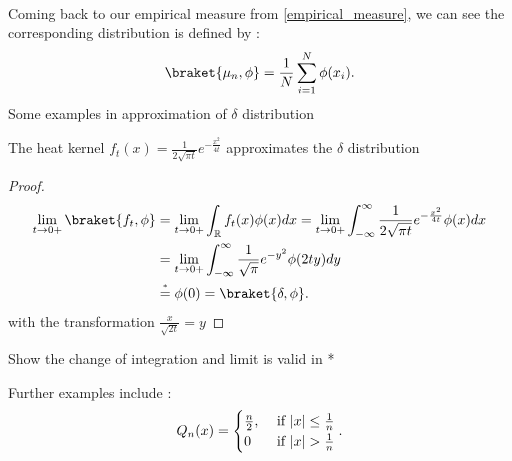 \hspace{0mm}\\
Coming back to our empirical measure from \ref{empirical_measure}, we can see the corresponding distribution is defined by : 
\begin{align*}
  \braket{\mu_n,\phi } = \frac{1}{N} \sum_{i=1}^{N} \phi(x_i)
.\end{align*}
Some examples in approximation of $\delta $ distribution 
\begin{example}
  The heat kernel $f_t(x) = \frac{1}{2 \sqrt{\pi  t} } e^{- \frac{x^2}{4t}} $
  approximates the $\delta $ distribution
\begin{figure}[h]
  \begin{center}
  \end{center}
\end{figure}
\end{example}
\begin{proof}
 \begin{align*}
   \lim_{t \to 0+} \braket{f_t,\phi } &= \lim_{t \to 0+} \int_\mathbb{R} f_t(x) \phi(x) dx = \lim_{t \to 0+} \int_{-\infty}^{\infty} \frac{1}{2 \sqrt{\pi  t} } e^{- \frac{x^2}{4t}}  \phi(x) dx \\
                                      &= \lim_{t \to 0+} \int_{-\infty}^{\infty} \frac{1}{\sqrt{\pi }} e^{-y^2}  \phi(2ty) dy \\
                                      &\myS{*}{=} \phi(0) = \braket{\delta ,\phi }
 .\end{align*} 
 with the transformation $\frac{x}{\sqrt{2t}} = y$
\end{proof}
\begin{exercise}
 Show the change of integration and limit is valid in * 
\end{exercise}
Further examples  include : 
\begin{align*}
  Q_n(x) = \begin{cases}
    \frac{n}{2} , &\text{ if }\lvert x\rvert \le  \frac{1}{n}\\
    0   &\text{ if } \lvert x\rvert > \frac{1}{n} 
  \end{cases}
.\end{align*}
